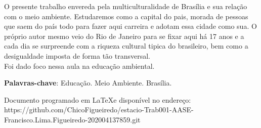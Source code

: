 
\setlength{\absparsep}{18pt} %
\begin{resumo}
 O presente trabalho envereda pela multiculturalidade de Brasília e sua relação com o meio ambiente. Estudaremos como a capital do pais, morada de pessoas que saem do país todo para fazer aqui carreira e adotam essa cidade como sua. O próprio autor mesmo veio do Rio de Janeiro para se fixar aqui há 17 anos e a cada dia se surpreende com a riqueza cultural tipica do brasileiro, bem como a desigualdade imposta de forma tão transversal. \\
 Foi dado foco nessa aula na educação ambiental.

 \textbf{Palavras-chave}: Educação. Meio Ambiente. Brasília.
\end{resumo}

Documento programado em \LaTeX e disponível no endereço: https://github.com/ChicoFigueiredo/estacio-Trab001-AASE-Francisco.Lima.Figueiredo-202004137859.git\\

